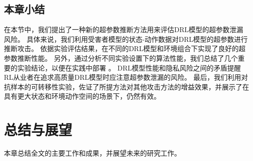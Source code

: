 \section{本章小结}
在本节中，我们提出了一种新的超参数推断方法用来评估DRL模型的超参数泄漏风险。
具体来说，我们利用受害者模型的状态-动作数据对DRL模型的超参数进行推断攻击。
依据实验评估结果，\sysname 在不同的DRL模型和环境组合下实现了良好的超参数推断性能。
另外，通过分析不同实验设置下的算法性能，我们总结了几个重要的实验结论，以便在实践中部署 \sysname。
DRL模型性能和隐私风险之间的矛盾提醒RL从业者在追求高质量DRL模型时应注意超参数泄漏的风险。
最后，我们利用对抗样本的可转移性实验，佐证了所提方法对其他攻击方法的增益效果，并展示了在具有更大状态和环境动作空间的场景下，\sysname 仍然有效。


\chapter{总结与展望}
本章总结全文的主要工作和成果，并展望未来的研究工作。
